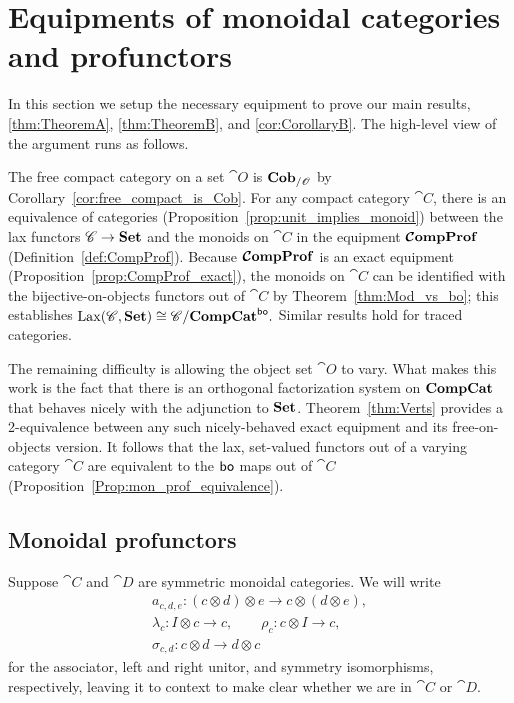 \documentclass[12pt,oneside,article,draft]{memoir}
\begin{document}
\chapter{Equipments of monoidal categories and profunctors}\label{sec:equipments_monoidal_profunctors}

In this section we setup the necessary equipment to prove our main results, \ref{thm:TheoremA},
\ref{thm:TheoremB}, and \ref{cor:CorollaryB}. The high-level view of the argument runs as follows.

The free compact category on a set $\cat{O}$ is $\mathbf{Cob}_{/\mathscr{O}}$ by
Corollary~\ref{cor:free_compact_is_Cob}. For any compact category $\cat{C}$, there is an equivalence
of categories (Proposition~\ref{prop:unit_implies_monoid}) between the lax functors $\mathscr{C}\to\mathbf{Set}$
and the monoids on $\cat{C}$ in the equipment $\bm{\mathcal{C}}\mathbf{ompProf}$ (Definition~\ref{def:CompProf}). Because
$\bm{\mathcal{C}}\mathbf{ompProf}$ is an exact equipment (Proposition~\ref{prop:CompProf_exact}), the monoids on $\cat{C}$
can be identified with the bijective-on-objects functors out of $\cat{C}$ by
Theorem~\ref{thm:Mod_vs_bo}; this establishes $\operatorname{Lax}(\mathscr{C},\mathbf{Set})\cong\mathscr{C}/\mathbf{CompCat}^{\mathsf{bo}}.$
Similar results hold for traced categories. 

The remaining difficulty is allowing the object set $\cat{O}$ to vary. What makes this work is the
fact that there is an orthogonal factorization system on $\mathbf{CompCat}$ that behaves nicely with the
adjunction to $\mathbf{Set}$. Theorem~\ref{thm:Verts} provides a 2-equivalence between any such
nicely-behaved exact equipment and its free-on-objects version. It follows that the lax, set-valued
functors out of a varying category $\cat{C}$ are equivalent to the $\mathsf{bo}$ maps out of $\cat{C}$
(Proposition~\ref{Prop:mon_prof_equivalence}). 


\section{Monoidal profunctors}\label{sec:monoidal_profunctors}

Suppose $\cat{C}$ and $\cat{D}$ are symmetric monoidal categories. We will write
\begin{gather*}
   a_{c,d,e}\colon (c\otimes d)\otimes e \to c\otimes(d\otimes e), \\
      \lambda_c\colon I\otimes c\to c,
      \qquad \rho_c\colon c\otimes I \to c, \\
      \sigma_{c,d}\colon c\otimes d\to d\otimes c
\end{gather*}
for the associator, left and right unitor, and symmetry isomorphisms, respectively, leaving it to
context to make clear whether we are in $\cat{C}$ or $\cat{D}$.
\end{document}
